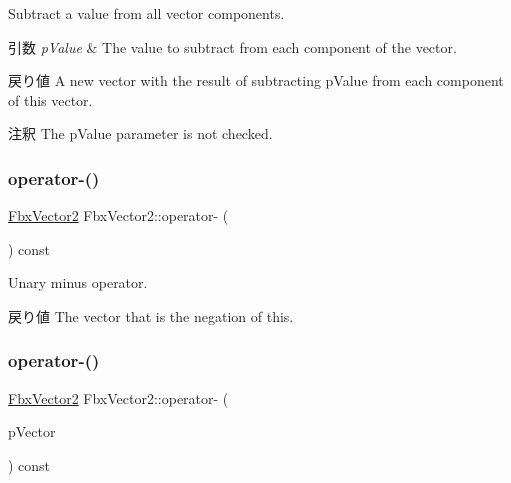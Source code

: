 Subtract a value from all vector components. 
\begin{DoxyParams}{引数}
{\em p\+Value} & The value to subtract from each component of the vector. \\
\hline
\end{DoxyParams}
\begin{DoxyReturn}{戻り値}
A new vector with the result of subtracting p\+Value from each component of this vector. 
\end{DoxyReturn}
\begin{DoxyRemark}{注釈}
The p\+Value parameter is not checked. 
\end{DoxyRemark}
\mbox{\label{class_fbx_vector2_a4a135af7caa6377da57df7cd4cd1e06b}} 
\subsubsection{\texorpdfstring{operator-\/()}{operator-()}\hspace{0.1cm}{\footnotesize\ttfamily [2/3]}}
{\footnotesize\ttfamily \hyperlink{class_fbx_vector2}{Fbx\+Vector2} Fbx\+Vector2\+::operator-\/ (\begin{DoxyParamCaption}{ }\end{DoxyParamCaption}) const}

Unary minus operator. \begin{DoxyReturn}{戻り値}
The vector that is the negation of {\ttfamily this}. 
\end{DoxyReturn}
\mbox{\label{class_fbx_vector2_ac0034032780f2e53ac9775bb8302b45d}} 
\subsubsection{\texorpdfstring{operator-\/()}{operator-()}\hspace{0.1cm}{\footnotesize\ttfamily [3/3]}}
{\footnotesize\ttfamily \hyperlink{class_fbx_vector2}{Fbx\+Vector2} Fbx\+Vector2\+::operator-\/ (\begin{DoxyParamCaption}\item[{const \hyperlink{class_fbx_vector2}{Fbx\+Vector2} \&}]{p\+Vector }\end{DoxyParamCaption}) const}

